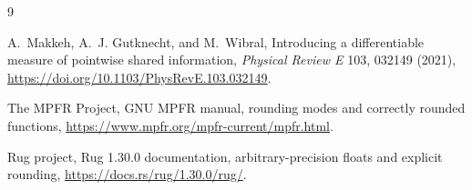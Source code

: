 \documentclass[11pt]{article}
\theoremstyle{definition}
\begin{document}
\begin{thebibliography}{9}

A.~Makkeh, A.~J. Gutknecht, and M.~Wibral,
\newblock Introducing a differentiable measure of pointwise shared information,
\newblock \emph{Physical Review E} 103, 032149 (2021),
\newblock \url{https://doi.org/10.1103/PhysRevE.103.032149}.

The MPFR Project,
\newblock GNU MPFR manual, rounding modes and correctly rounded functions,
\newblock \url{https://www.mpfr.org/mpfr-current/mpfr.html}.

Rug project,
\newblock Rug 1.30.0 documentation, arbitrary-precision floats and explicit rounding,
\newblock \url{https://docs.rs/rug/1.30.0/rug/}.

\end{thebibliography}
\end{document}
